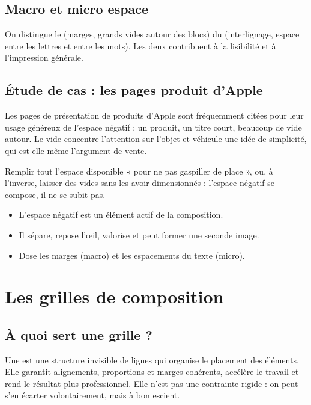 \subsection{Macro et micro espace}

On distingue le  (marges, grands vides autour des blocs) du  (interlignage, espace entre les lettres et entre les mots). Les deux contribuent à la lisibilité et à l'impression générale.

\subsection{Étude de cas : les pages produit d'Apple}

Les pages de présentation de produits d'Apple sont fréquemment citées pour leur usage généreux de l'espace négatif : un produit, un titre court, beaucoup de vide autour. Le vide concentre l'attention sur l'objet et véhicule une idée de simplicité, qui est elle-même l'argument de vente.

\begin{erreur}
Remplir tout l'espace disponible « pour ne pas gaspiller de place », ou, à l'inverse, laisser des vides sans les avoir dimensionnés : l'espace négatif se compose, il ne se subit pas.
\end{erreur}

\begin{retenir}
\begin{itemize}
  \item L'espace négatif est un élément actif de la composition.
  \item Il sépare, repose l'œil, valorise et peut former une seconde image.
  \item Dose les marges (macro) et les espacements du texte (micro).
\end{itemize}
\end{retenir}

\section{Les grilles de composition}

\subsection{À quoi sert une grille ?}

Une  est une structure invisible de lignes qui organise le placement des éléments. Elle garantit alignements, proportions et marges cohérents, accélère le travail et rend le résultat plus professionnel. Elle n'est pas une contrainte rigide : on peut s'en écarter volontairement, mais à bon escient.

